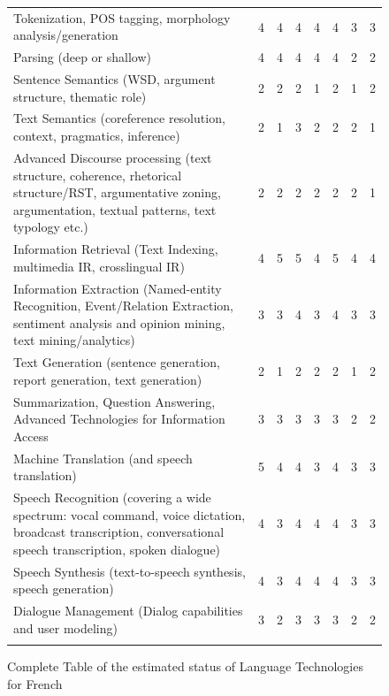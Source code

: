 \documentclass[]{../metanetpaper}
\begin{document}
\begin{multicols}{2}
\begin{figure}[!ht]
\begin{tabular}{>{\columncolor{orange1}}p{.50\linewidth}@{\hspace*{6mm}}c@{\hspace*{6mm}}c@{\hspace*{6mm}}c@{\hspace*{6mm}}c@{\hspace*{6mm}}c@{\hspace*{6mm}}c@{\hspace*{6mm}}c}
  Tokenization, POS tagging, morphology analysis/generation &4&4&4&4&4&3&3 \\ \addlinespace
  Parsing (deep or shallow) &4&4&4&4&4&2&2\\ \addlinespace
  Sentence Semantics (WSD, argument structure, thematic role) &2&2&2&1&2&1&2\\ \addlinespace
  Text Semantics (coreference resolution, context, pragmatics, inference) &2&1&3&2&2&2&1\\ \addlinespace
  Advanced Discourse processing (text structure, coherence, rhetorical structure/RST, argumentative zoning, argumentation, textual patterns, text typology etc.) &2&2&2&2&2&2&1\\ \addlinespace
  Information Retrieval (Text Indexing, multimedia IR, crosslingual IR) &4&5&5&4&5&4&4\\ \addlinespace
  Information Extraction (Named-entity Recognition, Event/Relation Extraction, sentiment analysis and opinion mining, text mining/analytics)&3&3&4&3&4&3&3\\ \addlinespace
  Text Generation (sentence generation, report generation, text generation) &2&1&2&2&2&1&2\\ \addlinespace
  Summarization, Question Answering, Advanced Technologies for Information Access &3&3&3&3&3&2&2\\ \addlinespace
  Machine Translation (and speech translation) &5&4&4&3&4&3&3\\ \addlinespace
  Speech Recognition (covering a wide spectrum: vocal command, voice dictation, broadcast transcription, conversational speech transcription, spoken dialogue) &4&3&4&4&4&3&3\\ \addlinespace
  Speech Synthesis (text-to-speech synthesis, speech generation)&4&3&4&4&4&3&3\\ \addlinespace
  Dialogue Management (Dialog capabilities and user modeling)&3&2&3&3&3&2&2\\ \addlinespace
  \end{tabular}
  \caption{Complete Table of the estimated status of Language Technologies for French}
  \label{fig:lrlttable_fr_1}
\end{figure}


\end{multicols}
\end{document}
